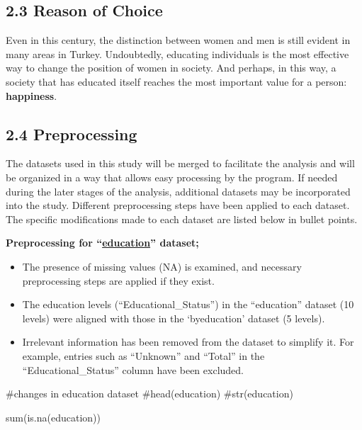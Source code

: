 \documentclass[
  11pt,
  a4paper,
  DIV=11,
  numbers=noendperiod]{scrartcl}
\newenvironment{Shaded}{\begin{snugshade}}{\end{snugshade}}
\newcommand{\CommentTok}[1]{\textcolor[rgb]{0.37,0.37,0.37}{#1}}
\newcommand{\FunctionTok}[1]{\textcolor[rgb]{0.28,0.35,0.67}{#1}}
\newcommand{\NormalTok}[1]{\textcolor[rgb]{0.00,0.23,0.31}{#1}}
\begin{document}
\subsection{2.3 Reason of Choice}\label{reason-of-choice}

Even in this century, the distinction between women and men is still
evident in many areas in Turkey. Undoubtedly, educating individuals is
the most effective way to change the position of women in society. And
perhaps, in this way, a society that has educated itself reaches the
most important value for a person: {\textbf{happiness}}.

\subsection{2.4 Preprocessing}\label{preprocessing}

The datasets used in this study will be merged to facilitate the
analysis and will be organized in a way that allows easy processing by
the program. If needed during the later stages of the analysis,
additional datasets may be incorporated into the study. Different
preprocessing steps have been applied to each dataset. The specific
modifications made to each dataset are listed below in bullet points.

\textbf{Preprocessing for
``\href{https://github.com/emu-hacettepe-analytics/emu660-spring2025-ecavusgil}{education}''
dataset;}

\begin{itemize}
\item
  The presence of missing values (NA) is examined, and necessary
  preprocessing steps are applied if they exist.
\item
  The education levels (``Educational\_Status'') in the ``education''
  dataset (10 levels) were aligned with those in the `byeducation'
  dataset (5 levels).
\item
  Irrelevant information has been removed from the dataset to simplify
  it. For example, entries such as ``Unknown'' and ``Total'' in the
  ``Educational\_Status'' column have been excluded.
\end{itemize}

\begin{Shaded}
\begin{Highlighting}[]
\CommentTok{\#changes in education dataset}
\CommentTok{\#head(education)}
\CommentTok{\#str(education)}

 \FunctionTok{sum}\NormalTok{(}\FunctionTok{is.na}\NormalTok{(education))}
\end{Highlighting}
\end{Shaded}
\end{document}
